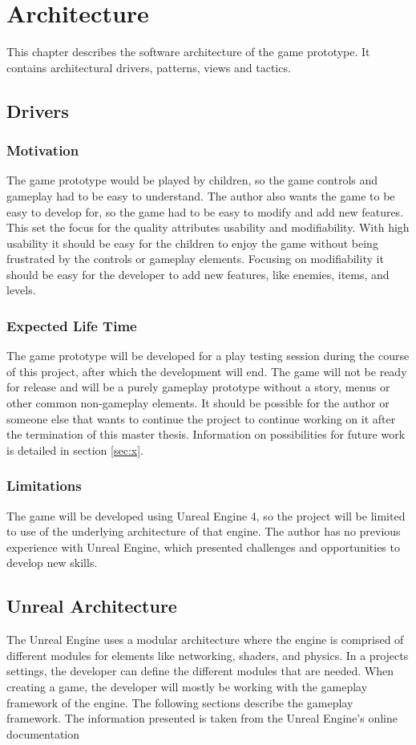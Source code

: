 \chapter{Architecture}
This chapter describes the software architecture of the game prototype. It contains architectural drivers, patterns, views and tactics.


\section{Drivers}
\subsection{Motivation}
The game prototype would be played by children, so the game controls and gameplay had to be easy to understand. The author also wants the game to be easy to develop for, so the game had to be easy to modify and add new features. This set the focus for the quality attributes usability and modifiability. With high usability it should be easy for the children to enjoy the game without being frustrated by the controls or gameplay elements. Focusing on modifiability it should be easy for the developer to add new features, like enemies, items, and levels.

\subsection{Expected Life Time}
The game prototype will be developed for a play testing session during the course of this project, after which the development will end. The game will not be ready for release and will be a purely gameplay prototype without a story, menus or other common non-gameplay elements. It should be possible for the author or someone else that wants to continue the project to continue working on it after the termination of this master thesis. Information on possibilities for future work is detailed in section \ref{sec:x}. 

\subsection{Limitations}
The game will be developed using Unreal Engine 4, so the project will be limited to use of the underlying architecture of that engine. The author has no previous experience with Unreal Engine, which presented challenges and opportunities to develop new skills. 


\section{Unreal Architecture}
The Unreal Engine uses a modular architecture where the engine is comprised of different modules for elements like networking, shaders, and physics. In a projects settings, the developer can define the different modules that are needed. When creating a game, the developer will mostly be working with the gameplay framework of the engine. The following sections describe the gameplay framework. The information presented is taken from the Unreal Engine's online documentation \cite{epicgames2016doc}


